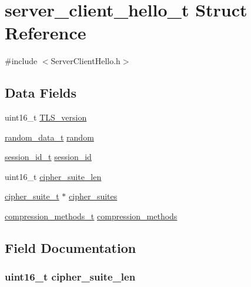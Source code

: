 \hypertarget{structserver__client__hello__t}{}\section{server\+\_\+client\+\_\+hello\+\_\+t Struct Reference}
\label{structserver__client__hello__t}


{\ttfamily \#include $<$Server\+Client\+Hello.\+h$>$}

\subsection*{Data Fields}
\begin{DoxyCompactItemize}
\item 
uint16\+\_\+t \hyperlink{structserver__client__hello__t_a5b4305b976c657bb4a056e00aeadb8ef}{T\+L\+S\+\_\+version}
\item 
\hyperlink{structrandom__data__t}{random\+\_\+data\+\_\+t} \hyperlink{structserver__client__hello__t_aefaae3d96978baaa21b9445a5728b4fe}{random}
\item 
\hyperlink{structsession__id__t}{session\+\_\+id\+\_\+t} \hyperlink{structserver__client__hello__t_a74379b0c9faddd3c3481e648a4ba2356}{session\+\_\+id}
\item 
uint16\+\_\+t \hyperlink{structserver__client__hello__t_a706adb2fc3f8fa8fe9bdd5793f32183e}{cipher\+\_\+suite\+\_\+len}
\item 
\hyperlink{structcipher__suite__t}{cipher\+\_\+suite\+\_\+t} $\ast$ \hyperlink{structserver__client__hello__t_a545e2b09874bc2250aed603ef61820a6}{cipher\+\_\+suites}
\item 
\hyperlink{structcompression__methods__t}{compression\+\_\+methods\+\_\+t} \hyperlink{structserver__client__hello__t_a08a470f144044c5ea244590f9ead8165}{compression\+\_\+methods}
\end{DoxyCompactItemize}


\subsection{Field Documentation}
\subsubsection[{\texorpdfstring{cipher\+\_\+suite\+\_\+len}{cipher_suite_len}}]{\setlength{\rightskip}{0pt plus 5cm}uint16\+\_\+t cipher\+\_\+suite\+\_\+len}\hypertarget{structserver__client__hello__t_a706adb2fc3f8fa8fe9bdd5793f32183e}{}\label{structserver__client__hello__t_a706adb2fc3f8fa8fe9bdd5793f32183e}


